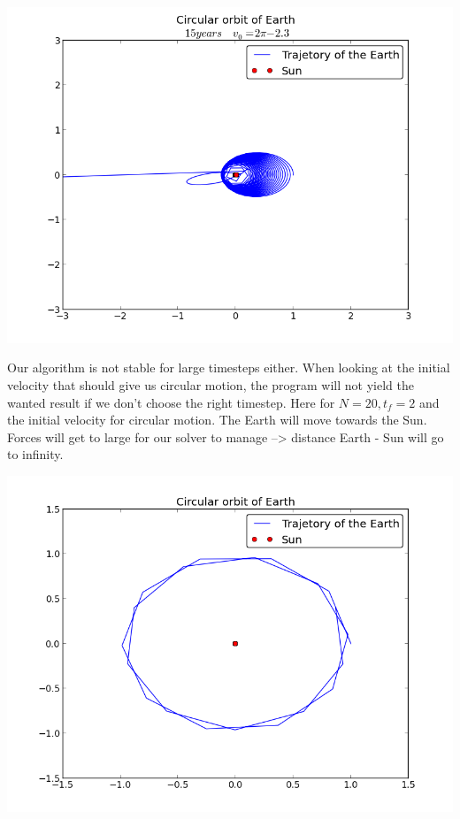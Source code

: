 \documentclass[a4paper,12pt, english]{article}
\begin{document}
\includegraphics[scale=0.5]{circular_orbit_3.png}

Our algorithm is not stable for large timesteps either. When looking at the initial velocity that should give us circular motion, the program will not yield the wanted result if we don't choose the right timestep. Here for $N = 20, t_f = 2$ and the initial velocity for circular motion.  
The Earth will move towards the Sun. Forces will get to large for our solver to manage --> distance Earth - Sun will go to infinity.
 
\includegraphics[scale=0.5]{timesteps_circular.png}
\end{document}
